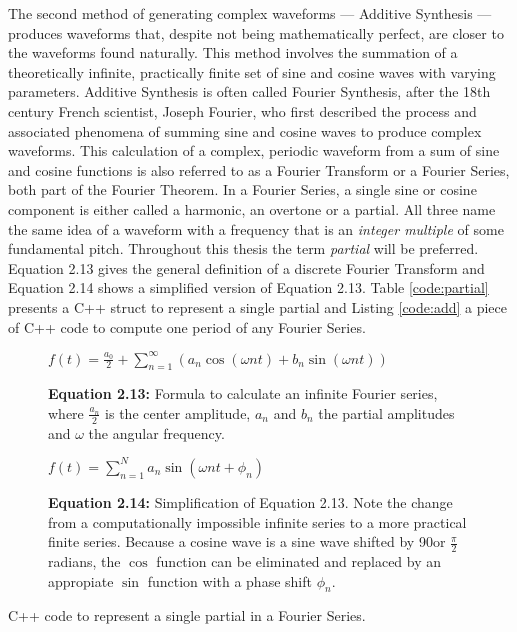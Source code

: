 The second method of generating complex waveforms --- Additive Synthesis --- produces waveforms that, despite not being mathematically perfect, are closer to the waveforms found naturally. This method involves the summation of a theoretically infinite, practically finite set of sine and cosine waves with varying parameters. Additive Synthesis is often called Fourier Synthesis, after the 18th century French scientist, Joseph Fourier, who first described the process and associated phenomena of summing sine and cosine waves to produce complex waveforms. This calculation of a complex, periodic waveform from a sum of sine and cosine functions is also referred to as a Fourier Transform or a Fourier Series, both part of the Fourier Theorem. In a Fourier Series, a single sine or cosine component is either called a harmonic, an overtone or a partial. All three name the same idea of a waveform with a frequency that is an \emph{integer multiple} of some fundamental pitch.  Throughout this thesis the term \emph{partial} will be preferred. Equation 2.13 gives the general definition of a discrete Fourier Transform and Equation 2.14 shows a simplified version of Equation 2.13. Table \ref{code:partial} presents a C++ struct to represent a single partial and Listing \ref{code:add} a piece of C++ code to compute one period of any Fourier Series.

\begin{figure}[h!]
  $f(t) = \frac{a_{0}}{2} + \sum\limits_{n=1}^\infty (a_{n} \cos(\omega n t) + b_{n} \sin(\omega n t))$
  \caption*{\textbf{Equation 2.13: }Formula to calculate an infinite Fourier series, where $\frac{a_{n}}{2}$ is the center amplitude, $a_{n}$ and $b_{n}$ the partial amplitudes and $\omega$ the angular frequency.}
  \label{fig:fourier1}
\end{figure}

\begin{figure}[h!]
  $f(t) = \sum\limits_{n=1}^N a_{n} \sin(\omega n t + \phi_{n})$
  \caption*{\textbf{Equation 2.14:} Simplification of Equation 2.13. Note the change from a computationally impossible infinite series to a more practical finite series. Because a cosine wave is a sine wave shifted by 90\degree or $\frac{\pi}{2}$ radians, the $\cos$ function can be eliminated and replaced by an appropiate $\sin$ function with a phase shift $\phi_{n}$.}
  \label{fig:fourier2}
\end{figure}

\begin{table}[h!]
  \caption{C++ code to represent a single partial in a Fourier Series.}
  \label{code:partial}
\end{table}

